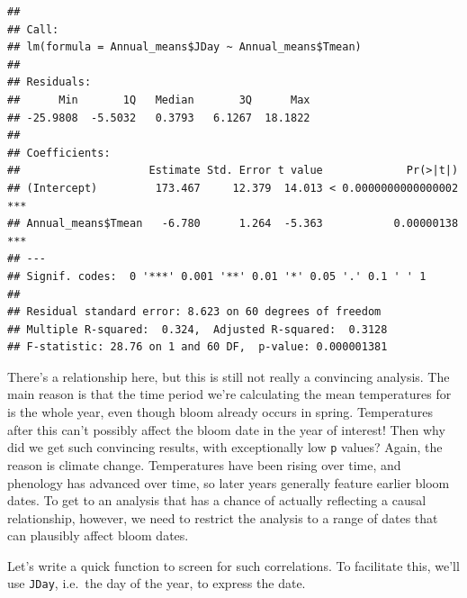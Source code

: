 \documentclass[
]{book}
\begin{document}
\begin{verbatim}
## 
## Call:
## lm(formula = Annual_means$JDay ~ Annual_means$Tmean)
## 
## Residuals:
##      Min       1Q   Median       3Q      Max 
## -25.9808  -5.5032   0.3793   6.1267  18.1822 
## 
## Coefficients:
##                    Estimate Std. Error t value             Pr(>|t|)    
## (Intercept)         173.467     12.379  14.013 < 0.0000000000000002 ***
## Annual_means$Tmean   -6.780      1.264  -5.363           0.00000138 ***
## ---
## Signif. codes:  0 '***' 0.001 '**' 0.01 '*' 0.05 '.' 0.1 ' ' 1
## 
## Residual standard error: 8.623 on 60 degrees of freedom
## Multiple R-squared:  0.324,  Adjusted R-squared:  0.3128 
## F-statistic: 28.76 on 1 and 60 DF,  p-value: 0.000001381
\end{verbatim}

There's a relationship here, but this is still not really a convincing analysis. The main reason is that the time period we're calculating the mean temperatures for is the whole year, even though bloom already occurs in spring. Temperatures after this can't possibly affect the bloom date in the year of interest! Then why did we get such convincing results, with exceptionally low \texttt{p} values? Again, the reason is climate change. Temperatures have been rising over time, and phenology has advanced over time, so later years generally feature earlier bloom dates. To get to an analysis that has a chance of actually reflecting a causal relationship, however, we need to restrict the analysis to a range of dates that can plausibly affect bloom dates.

Let's write a quick function to screen for such correlations. To facilitate this, we'll use \texttt{JDay}, i.e.~the day of the year, to express the date.
\end{document}
